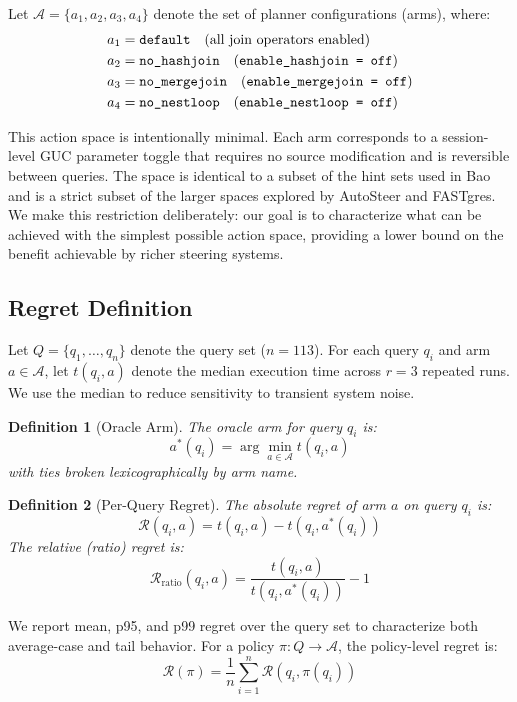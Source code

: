 \documentclass[sigconf,natbib=false]{article}
\newcommand{\regret}{\mathcal{R}}
\newcommand{\policy}{\pi}
\newtheorem{definition}{Definition}
\begin{document}
Let $\mathcal{A} = \{a_1, a_2, a_3, a_4\}$ denote the set of planner configurations
(arms), where:
\begin{align*}
a_1 &= \texttt{default} \quad\text{(all join operators enabled)}\\
a_2 &= \texttt{no\_hashjoin} \quad\text{(\texttt{enable\_hashjoin = off})}\\
a_3 &= \texttt{no\_mergejoin} \quad\text{(\texttt{enable\_mergejoin = off})}\\
a_4 &= \texttt{no\_nestloop} \quad\text{(\texttt{enable\_nestloop = off})}
\end{align*}

This action space is intentionally minimal. Each arm corresponds to a session-level GUC
parameter toggle that requires no source modification and is reversible between queries.
The space is identical to a subset of the hint sets used in Bao and is a strict subset of
the larger spaces explored by AutoSteer and FASTgres. We make this restriction deliberately:
our goal is to characterize what can be achieved with the simplest possible action space,
providing a lower bound on the benefit achievable by richer steering systems.

\subsection{Regret Definition}

Let $Q = \{q_1, \ldots, q_n\}$ denote the query set ($n=113$). For each query $q_i$ and
arm $a \in \mathcal{A}$, let $t(q_i, a)$ denote the median execution time across $r=3$
repeated runs. We use the median to reduce sensitivity to transient system noise.

\begin{definition}[Oracle Arm]
The oracle arm for query $q_i$ is:
\[
  a^*(q_i) = \arg\min_{a \in \mathcal{A}} t(q_i, a)
\]
with ties broken lexicographically by arm name.
\end{definition}

\begin{definition}[Per-Query Regret]
The absolute regret of arm $a$ on query $q_i$ is:
\[
  \regret(q_i, a) = t(q_i, a) - t(q_i, a^*(q_i))
\]
The relative (ratio) regret is:
\[
  \regret_{\mathrm{ratio}}(q_i, a) = \frac{t(q_i, a)}{t(q_i, a^*(q_i))} - 1
\]
\end{definition}

We report mean, p95, and p99 regret over the query set to characterize both average-case and
tail behavior. For a policy $\policy: Q \to \mathcal{A}$, the policy-level regret is:
\[
  \regret(\policy) = \frac{1}{n} \sum_{i=1}^n \regret(q_i, \policy(q_i))
\]
\end{document}
